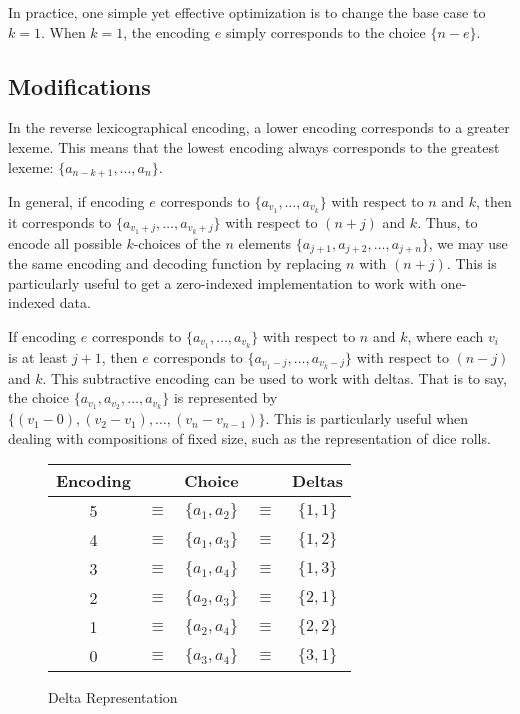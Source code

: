 \documentclass[preprint]{sigplanconf}
\begin{document}
	In practice, one simple yet effective optimization is to change the base case to $k=1$.
	When $k=1$, the encoding $e$ simply corresponds to the choice $\{n-e\}$.
	
		
	\subsection{Modifications}
	
	In the reverse lexicographical encoding, a lower encoding corresponds to a greater lexeme.
	This means that the lowest encoding always corresponds to the greatest lexeme: $\{ a_{n-k+1}, \ldots, a_n \}$.
	
	In general, if encoding $e$ corresponds to $\{ a_{v_1}, \ldots, a_{v_k} \}$ with respect to $n$ and $k$, then it corresponds to $\{ a_{v_1+j}, \ldots, a_{v_k+j} \}$ with respect to $(n+j)$ and $k$.
	Thus, to encode all possible $k$-choices of the $n$ elements $\{ a_{j+1}, a_{j+2}, \ldots, a_{j+n} \}$, we may use the same encoding and decoding function by replacing $n$ with $(n+j)$.
	This is particularly useful to get a zero-indexed implementation to work with one-indexed data.
	
	If encoding $e$ corresponds to $\{ a_{v_1}, \ldots, a_{v_k} \}$ with respect to $n$ and $k$, where each $v_i$ is at least $j+1$,
		then $e$ corresponds to $\{ a_{v_1-j}, \ldots, a_{v_k-j} \}$ with respect to $(n-j)$ and $k$.
	This subtractive encoding can be used to work with deltas.
	That is to say, the choice $\{ a_{v_1}, a_{v_2}, \ldots, a_{v_k} \}$ is represented by $\{ (v_1-0), (v_2-v_1),\ldots,(v_n-v_{n-1}) \}$.
	This is particularly useful when dealing with compositions of fixed size, such as the representation of dice rolls.
	
	\begin{figure}[!ht]
		\begin{center}
		\begin{tabular}{ccccc}
			Encoding & & Choice & & Deltas \\
			\hline
			5 & $\equiv$ & $\{a_1, a_2\}$ & $\equiv$ & $\{1,1\}$ \\
			4 & $\equiv$ & $\{a_1, a_3\}$ & $\equiv$ & $\{1,2\}$ \\
			3 & $\equiv$ & $\{a_1, a_4\}$ & $\equiv$ & $\{1,3\}$ \\
			2 & $\equiv$ & $\{a_2, a_3\}$ & $\equiv$ & $\{2,1\}$ \\
			1 & $\equiv$ & $\{a_2, a_4\}$ & $\equiv$ & $\{2,2\}$ \\
			0 & $\equiv$ & $\{a_3, a_4\}$ & $\equiv$ & $\{3,1\}$ \\
		\end{tabular}
		\caption{Delta Representation}
		\label{DEx}
		\end{center}
	\end{figure}
	
\end{document}
